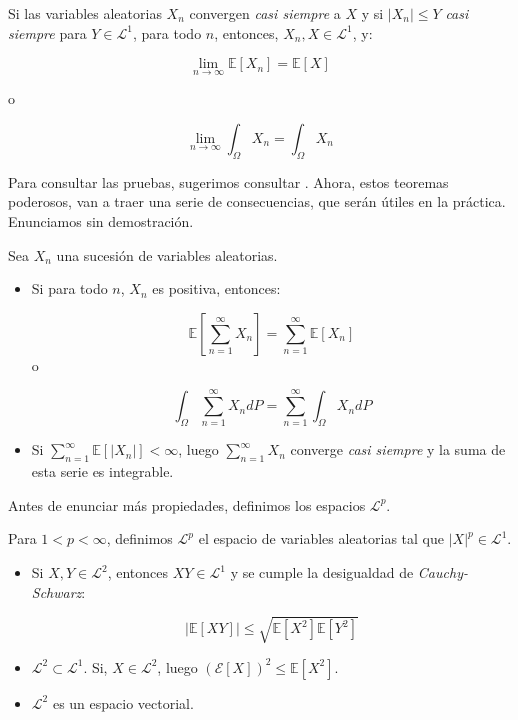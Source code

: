 \begin{theorem}
	Si las variables aleatorias $X_n$ convergen \textit{casi siempre} a $X$ y si $\lvert X_n \rvert \leq Y$ \textit{casi siempre} para $Y \in \mathcal{L}^1$, para todo $n$, entonces, $X_n, X \in \mathcal{L}^1$, y:

	\[
		\lim_{n \rightarrow \infty } \mathbb{E}[X_n] = \mathbb{E}[X]
	\] 

	o

	\[
		\lim_{n \rightarrow \infty } \int_{\Omega} X_n = \int_{\Omega} X_n
	\]
\end{theorem}

Para consultar las pruebas, sugerimos consultar \cite{Probability_Essentials}. Ahora, estos teoremas poderosos, van a traer una serie de consecuencias, que serán útiles en la práctica. Enunciamos sin demostración.

\begin{theorem}
	Sea $X_n$ una sucesión de variables aleatorias.

	\begin{itemize}
		\item Si para todo $n$, $X_n$ es positiva, entonces:

		\[
			\mathbb{E} \left[ \sum_{n = 1}^{\infty} X_n  \right] =  \sum_{n = 1}^{\infty} \mathbb{E}[X_n]
		\]
		o

		\[
			\int_{\Omega} \sum_{n = 1}^{\infty} X_n  dP  =  \sum_{n = 1}^{\infty} \int_{\Omega} X_n dP
		\]

		\item Si $\sum_{n = 1}^{\infty} \mathbb{E}[ \lvert X_n \rvert ] < \infty$, luego $\sum_{n = 1}^{\infty} X_n$ converge \textit{casi siempre} y la suma de esta serie es integrable. 
	\end{itemize}
\end{theorem}

Antes de enunciar más propiedades, definimos los espacios $\mathcal{L}^p$.

\begin{boxDef}
	Para $1 < p < \infty$, definimos $\mathcal{L}^p$ el espacio de variables aleatorias tal que $\lvert X \rvert^p \in \mathcal{L}^1$.
\end{boxDef}


\begin{theorem}
	\begin{itemize}
		\item Si $X, Y \in \mathcal{L}^2$, entonces $XY \in \mathcal{L}^1$ y se cumple la desigualdad de \textit{Cauchy-Schwarz}:

		\[
			\lvert \mathbb{E}[XY] \rvert \leq \sqrt{ \mathbb{E}[X^2] \mathbb{E}[Y^2] }
		\] 
		\item $\mathcal{L}^2 \subset \mathcal{L}^1$. Si, $X \in \mathcal{L}^2$, luego $\left(\mathcal{E}[X] \right)^2 \leq \mathbb{E}[X^2]$.

		\item $\mathcal{L}^2$ es un espacio vectorial.
	\end{itemize}	
\end{theorem}

